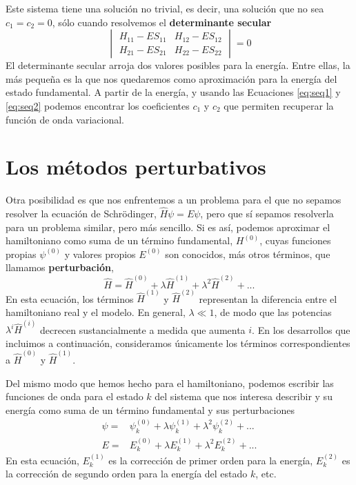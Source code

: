 \documentclass{tufte-handout}
\begin{document}
Este sistema tiene una solución no trivial, es decir,
una solución que no sea $c_1=c_2=0$, sólo cuando resolvemos 
el \textbf{determinante secular}
\begin{equation}
\begin{vmatrix}
 H_{11}-ES_{11} &  H_{12}-ES_{12}  \\ 
 H_{21}-ES_{21} &  H_{22}-ES_{22}
\end{vmatrix}= 0
\end{equation}
El determinante secular arroja dos valores posibles
para la energía. Entre ellas, la más pequeña es 
la que nos quedaremos como aproximación para la energía
del estado fundamental. A partir de la energía, y usando
las Ecuaciones \ref{eq:seq1} y \ref{eq:seq2} podemos
encontrar los coeficientes $c_1$ y $c_2$ que permiten
recuperar la función de onda variacional.

\section{Los métodos perturbativos}
Otra posibilidad es que nos enfrentemos a un problema 
para el que no sepamos resolver la ecuación de Schrödinger,
$\hat{H}\psi=E\psi$, pero que sí sepamos resolverla para
un problema similar, pero más sencillo.
Si es así, podemos aproximar el hamiltoniano como suma 
de un término fundamental, $H^{(0)}$, cuyas funciones propias 
$\psi^{(0)}$ y valores propios $E^{(0)}$ son conocidos,
más otros términos, que llamamos \textbf{perturbación}, 
\begin{equation}
    \hat{H}=\hat{H}^{(0)} + \lambda\hat{H}^{(1)} + 
    \lambda^2 \hat{H}^{(2)} + ...
    \label{eq:H_pert}
\end{equation}
En esta ecuación, los términos $\hat{H}^{(1)}$ y 
$\hat{H}^{(2)}$ representan la diferencia entre el
hamiltoniano real y el modelo. En general,
$\lambda \ll 1$, de modo que las potencias
$\lambda^i\hat{H}^{(i)}$ decrecen sustancialmente 
a medida que aumenta $i$. En los desarrollos que 
incluimos a continuación, consideramos únicamente los
términos correspondientes a $\hat{H}^{(0)}$ y 
$\hat{H}^{(1)}$.

Del mismo modo que hemos hecho para el hamiltoniano, 
podemos escribir las funciones de onda para el estado $k$
del sistema que nos interesa describir y su energía 
como suma de un término fundamental y sus perturbaciones
\begin{align}
    \psi =& \psi_k^{(0)} + \lambda\psi_k^{(1)} + \lambda^2\psi_k^{(2)} + ... \label{eq:psi_pert}\\
    E =& E_k^{(0)} + \lambda E_k^{(1)} + \lambda^2E_k^{(2)}+ ...
    \label{eq:E_pert}
\end{align}
En esta ecuación, $E_k^{(1)}$ es la corrección de primer orden
para la energía,  $E_k^{(2)}$ es la corrección de segundo orden 
para la energía del
estado $k$, etc. 
\end{document}
